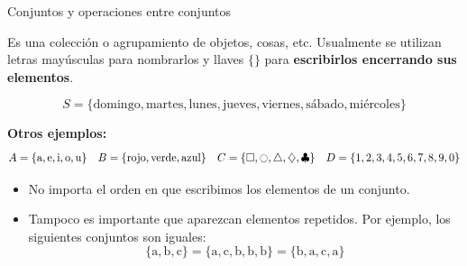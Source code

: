 \documentclass[9pt, aspectratio=169]{beamer}
\begin{document}
\begin{frame}{Conjuntos y operaciones entre conjuntos}
\begin{definition}[Conjunto]
        Es una colección o agrupamiento de objetos, cosas, etc. Usualmente se utilizan letras mayúsculas para nombrarlos y llaves $\{\}$ para \textbf{escribirlos encerrando sus elementos}.
\end{definition} 
\pause

\begin{example}
\[ S = \{ \text{domingo}, \text{martes}, \text{lunes}, \text{jueves}, \text{viernes}, \text{sábado}, \text{miércoles} \} \]
\end{example} \pause

\textbf{Otros ejemplos:}
\[ A = \{ \text{a}, \text{e}, \text{i}, \text{o}, \text{u} \} \quad B = \{ \text{rojo}, \text{verde}, \text{azul} \} \quad C = \{ \square, \ocircle, \triangle, \diamondsuit, \clubsuit\} \quad  D  = \{1, 2, 3, 4, 5, 6,7 ,8, 9, 0 \}  \]
\pause

\begin{alertblock}{\centering \faInfoCircle}
    \begin{itemize}
        \item \alert{No importa} el orden en que escribimos los elementos de un conjunto.
        \item Tampoco es importante que aparezcan \alert{elementos repetidos}. Por ejemplo, los siguientes conjuntos son iguales:
            \[ \{ \text{a}, \text{b}, \text{c} \} = \{ \text{a}, \text{c}, \text{b}, \text{b}, \text{b} \} = \{ \text{b}, \text{a}, \text{c}, \text{a} \} \]
    \end{itemize}
\end{alertblock}
\end{frame}
\end{document}
